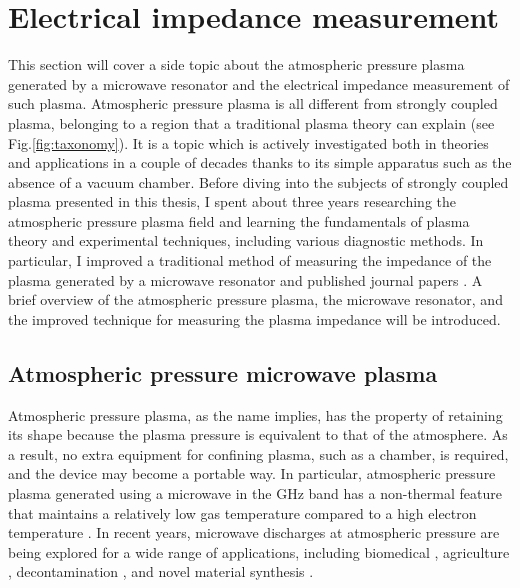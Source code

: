 
\chapter{Electrical impedance measurement}
\label{sec:ap7}

This section will cover a side topic about the atmospheric pressure plasma generated by a microwave resonator and the electrical impedance measurement of such plasma. Atmospheric pressure plasma is all different from strongly coupled plasma, belonging to a region that a traditional plasma theory can explain (see Fig.\ref{fig:taxonomy}). It is a topic which is actively investigated both in theories and applications in a couple of decades thanks to its simple apparatus such as the absence of a vacuum chamber. Before diving into the subjects of strongly coupled plasma presented in this thesis, I spent about three years researching the atmospheric pressure plasma field and learning the fundamentals of plasma theory and experimental techniques, including various diagnostic methods. In particular, I improved a traditional method of measuring the impedance of the plasma generated by a microwave resonator and published journal papers \cite{lee2017situ, nam2017asymmetric}. A brief overview of the atmospheric pressure plasma, the microwave resonator, and the improved technique for measuring the plasma impedance will be introduced.

\section{Atmospheric pressure microwave plasma}
\label{sec:ap7-1}

Atmospheric pressure plasma, as the name implies, has the property of retaining its shape because the plasma pressure is equivalent to that of the atmosphere. As a result, no extra equipment for confining plasma, such as a chamber, is required, and the device may become a portable way. In particular, atmospheric pressure plasma generated using a microwave in the GHz band has a non-thermal feature that maintains a relatively low gas temperature compared to a high electron temperature \cite{tendero2006atmospheric}. In recent years, microwave discharges at atmospheric pressure are being explored for a wide range of applications, including biomedical \cite{lu2016reactive, graves2014low}, agriculture \cite{sera2008germination}, decontamination \cite{kuo2007fan}, and novel material synthesis \cite{kramer2015cold, vollath2008plasma}. 

